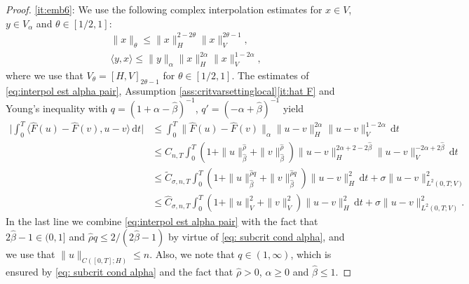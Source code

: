 \documentclass{amsart}
\newcommand{\dd}{\,\mathrm{d}}
\newcommand{\<}{\langle}
\newcommand{\?}{\rangle}
\theoremstyle{plain}
\theoremstyle{remark}
\theoremstyle{plain}
\numberwithin{equation}{section}
\begin{document}
\begin{proof}
\ref{it:emb6}:  
We use the following complex interpolation estimates for $x\in V$, $y\in V_\alpha$ and $\theta\in[1/2,1]$:  
\begin{equation}\label{eq:interpol est alpha pair}
\begin{split}
&\|x\|_{\theta}\leq \|x\|_H^{2-2\theta}\|x\|_V^{2\theta-1}, \\   
&\<y,x\? \leq   \|y\|_{\alpha}\|x\|_{H}^{2\alpha}\|x\|_V^{1-2\alpha}, 
\end{split}
\end{equation}
where we use that $V_\theta=[H,V]_{2\theta-1}$ for $\theta\in[1/2,1]$. 
The   estimates of \eqref{eq:interpol est alpha pair}, Assumption \ref{ass:critvarsettinglocal}\ref{it:hat F} and Young's inequality  with $q= (1+\alpha-\hat{\beta})^{-1}$, $q'= (-\alpha+\hat{\beta})^{-1}$ yield
  \begin{align*} 
   \Big|\int_0^T\<\hat{F}(u)-\hat{F}(v),u-v\?\dd t    \Big|
  &\leq   \int_0^T \|\hat{F}(u)-\hat{F}(v)\|_\alpha\|u-v\|_H^{2\alpha}\|u-v\|_V^{1-2\alpha} \dd t \\
  &\leq  {C}_{n,T} \int_0^T  (1+\|u\|_{\hat{\beta}}^{\hat{\rho}}+ \|v\|_{\hat{\beta}}^{\hat{\rho}})\|u-v\|_H^{2\alpha+2-2\hat{\beta}}\|u-v\|_V^{-2\alpha+2\hat{\beta}} \dd t \\
  &\leq  \tilde{C}_{\sigma,n,T} \int_0^T  (1+\|u\|_{\hat{\beta}}^{\hat{\rho}q}+ \|v\|_{\hat{\beta}}^{\hat{\rho}q}) \|u-v\|_H^{2} \dd t +\sigma\|u-v\|_{L^2(0,T;V)}^2 \\
   &\leq \hat{C}_{\sigma,n,T} \int_0^T  (1+\|u\|_V^2+ \|v\|_V^2)\|u-v\|_H^2\dd t+\sigma\|u-v\|_{L^2(0,T;V)}^2. 
  \end{align*} 
 In the last line we  combine \eqref{eq:interpol est alpha pair} with the fact that $2\hat{\beta}-1\in(0,1]$ and 
$\hat{\rho}q\leq  {2}/({2\hat{\beta}-1})$ by virtue of  \eqref{eq: subcrit cond alpha}, and we use that    $\|u\|_{C([0,T];H)}\leq n$. Also, we note that $q\in(1,\infty)$, which is ensured by  \eqref{eq: subcrit cond alpha} and the fact that $\hat{\rho}>0$, $\alpha\geq 0$ and $\hat{\beta}\leq 1$. 
\end{proof}
\end{document}
